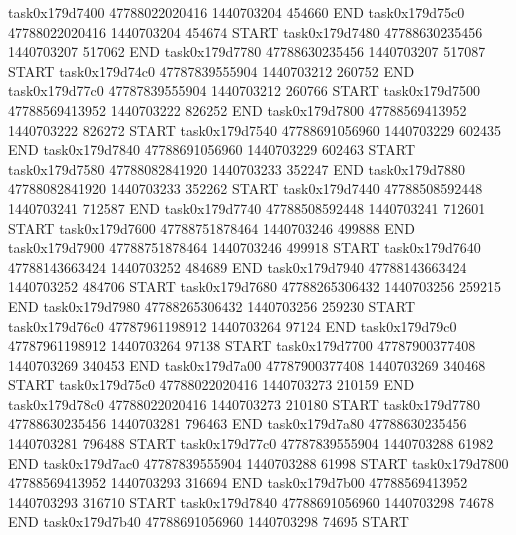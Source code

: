 task0x179d7400 47788022020416          1440703204               454660  END
task0x179d75c0 47788022020416          1440703204               454674  START
task0x179d7480 47788630235456          1440703207               517062  END
task0x179d7780 47788630235456          1440703207               517087  START
task0x179d74c0 47787839555904          1440703212               260752  END
task0x179d77c0 47787839555904          1440703212               260766  START
task0x179d7500 47788569413952          1440703222               826252  END
task0x179d7800 47788569413952          1440703222               826272  START
task0x179d7540 47788691056960          1440703229               602435  END
task0x179d7840 47788691056960          1440703229               602463  START
task0x179d7580 47788082841920          1440703233               352247  END
task0x179d7880 47788082841920          1440703233               352262  START
task0x179d7440 47788508592448          1440703241               712587  END
task0x179d7740 47788508592448          1440703241               712601  START
task0x179d7600 47788751878464          1440703246               499888  END
task0x179d7900 47788751878464          1440703246               499918  START
task0x179d7640 47788143663424          1440703252               484689  END
task0x179d7940 47788143663424          1440703252               484706  START
task0x179d7680 47788265306432          1440703256               259215  END
task0x179d7980 47788265306432          1440703256               259230  START
task0x179d76c0 47787961198912          1440703264                97124  END
task0x179d79c0 47787961198912          1440703264                97138  START
task0x179d7700 47787900377408          1440703269               340453  END
task0x179d7a00 47787900377408          1440703269               340468  START
task0x179d75c0 47788022020416          1440703273               210159  END
task0x179d78c0 47788022020416          1440703273               210180  START
task0x179d7780 47788630235456          1440703281               796463  END
task0x179d7a80 47788630235456          1440703281               796488  START
task0x179d77c0 47787839555904          1440703288                61982  END
task0x179d7ac0 47787839555904          1440703288                61998  START
task0x179d7800 47788569413952          1440703293               316694  END
task0x179d7b00 47788569413952          1440703293               316710  START
task0x179d7840 47788691056960          1440703298                74678  END
task0x179d7b40 47788691056960          1440703298                74695  START
